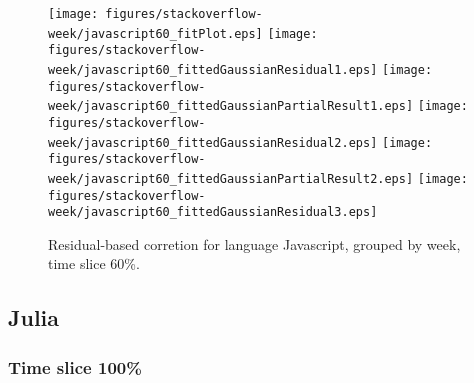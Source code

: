 \begin{figure}[t]
\centering
{}
{\texttt{[image: figures/stackoverflow-week/javascript60\_fitPlot.eps]}}
{\texttt{[image: figures/stackoverflow-week/javascript60\_fittedGaussianResidual1.eps]}}
{\texttt{[image: figures/stackoverflow-week/javascript60\_fittedGaussianPartialResult1.eps]}}
{\texttt{[image: figures/stackoverflow-week/javascript60\_fittedGaussianResidual2.eps]}}
{\texttt{[image: figures/stackoverflow-week/javascript60\_fittedGaussianPartialResult2.eps]}}
{\texttt{[image: figures/stackoverflow-week/javascript60\_fittedGaussianResidual3.eps]}}
\caption{Residual-based corretion for language Javascript, grouped by week, time slice 60\%.}
\end{figure}


\FloatBarrier


\subsection{Julia}

\subsubsection{Time slice 100\%}

